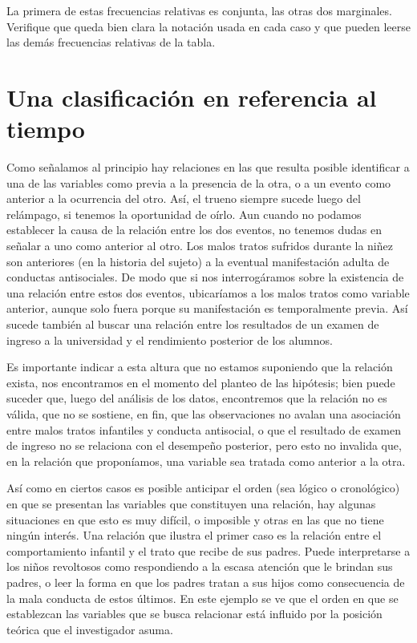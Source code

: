 \documentclass[]{book}
\begin{document}
La primera de estas frecuencias relativas es conjunta, las otras dos
marginales. Verifique que queda bien clara la notación usada en cada
caso y que pueden leerse las demás frecuencias relativas de la tabla.

\hypertarget{una-clasificacion-en-referencia-al-tiempo}{%
\section{Una clasificación en referencia al tiempo}\label{una-clasificacion-en-referencia-al-tiempo}}

Como señalamos al principio hay relaciones en las que resulta posible
identificar a una de las variables como previa a la presencia de la
otra, o a un evento como anterior a la ocurrencia del otro. Así, el
trueno siempre sucede luego del relámpago, si tenemos la oportunidad de
oírlo. Aun cuando no podamos establecer la causa de la relación entre
los dos eventos, no tenemos dudas en señalar a uno como anterior al
otro. Los malos tratos sufridos durante la niñez son anteriores (en la
historia del sujeto) a la eventual manifestación adulta de conductas
antisociales. De modo que si nos interrogáramos sobre la existencia de
una relación entre estos dos eventos, ubicaríamos a los malos tratos
como variable anterior, aunque solo fuera porque su manifestación es
temporalmente previa. Así sucede también al buscar una relación entre
los resultados de un examen de ingreso a la universidad y el rendimiento
posterior de los alumnos.

Es importante indicar a esta altura que no estamos suponiendo que la
relación exista, nos encontramos en el momento del planteo de las
hipótesis; bien puede suceder que, luego del análisis de los datos,
encontremos que la relación no es válida, que no se sostiene, en fin,
que las observaciones no avalan una asociación entre malos tratos
infantiles y conducta antisocial, o que el resultado de examen de
ingreso no se relaciona con el desempeño posterior, pero esto no
invalida que, en la relación que proponíamos, una variable sea tratada
como anterior a la otra.

Así como en ciertos casos es posible anticipar el orden (sea lógico o
cronológico) en que se presentan las variables que constituyen una
relación, hay algunas situaciones en que esto es muy difícil, o
imposible y otras en las que no tiene ningún interés. Una relación que
ilustra el primer caso es la relación entre el comportamiento infantil y
el trato que recibe de sus padres. Puede interpretarse a los niños
revoltosos como respondiendo a la escasa atención que le brindan sus
padres, o leer la forma en que los padres tratan a sus hijos como
consecuencia de la mala conducta de estos últimos. En este ejemplo se ve
que el orden en que se establezcan las variables que se busca relacionar
está influido por la posición teórica que el investigador asuma.
\end{document}
